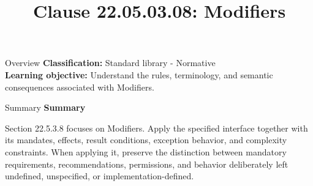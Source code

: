 \documentclass[10pt,letterpaper]{article}
\title{Clause 22.05.03.08: Modifiers}
\author{}
\date{}
\begin{document}
\maketitle
\begin{CornellOverviewBox}{Overview}
\textbf{Classification:} Standard library - Normative\\[2pt]
\textbf{Learning objective:} Understand the rules, terminology, and semantic consequences associated with Modifiers.
\end{CornellOverviewBox}\begin{CornellSummaryBox}{Summary}
{\sffamily\bfseries\color{Accent} Summary}\par\vspace{3pt}Section 22.5.3.8 focuses on Modifiers. Apply the specified interface together with its mandates, effects, result conditions, exception behavior, and complexity constraints. When applying it, preserve the distinction between mandatory requirements, recommendations, permissions, and behavior deliberately left undefined, unspecified, or implementation-defined.
\end{CornellSummaryBox}
\end{document}
